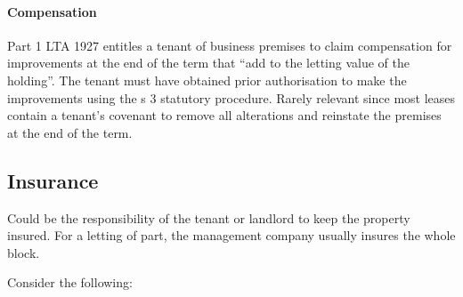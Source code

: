 \documentclass[
]{article}
\begin{document}
\hypertarget{compensation}{%
\paragraph{Compensation}\label{compensation}}

Part 1 LTA 1927 entitles a tenant of business premises to claim
compensation for improvements at the end of the term that ``add to the
letting value of the holding''. The tenant must have obtained prior
authorisation to make the improvements using the s 3 statutory
procedure. Rarely relevant since most leases contain a tenant's covenant
to remove all alterations and reinstate the premises at the end of the
term.

\hypertarget{insurance}{%
\subsection{Insurance}\label{insurance}}

Could be the responsibility of the tenant or landlord to keep the
property insured. For a letting of part, the management company usually
insures the whole block.

Consider the following:
\end{document}
